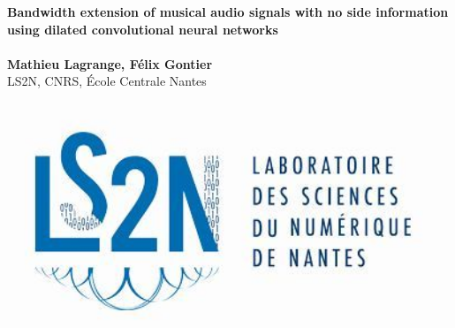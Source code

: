 \documentclass[a0,portrait,15pt]{a0poster}
\begin{document}



\begin{minipage}[b]{0.75\linewidth}
\veryHuge \color{NavyBlue} \textbf{Bandwidth extension of musical audio signals with no side information using dilated convolutional neural networks} \color{Black}\\ %
\Huge\textit{}\\[2cm] %
\huge \textbf{Mathieu Lagrange, F\'elix Gontier}\\[0.5cm] %
\huge LS2N, CNRS, \'Ecole Centrale Nantes\\[0.4cm] %
\end{minipage}
%
\begin{minipage}[b]{0.25\linewidth}
\includegraphics[width=20cm]{figures/logoLs2n.jpg}\\
\end{minipage}

\vspace{1cm} %

\end{document}
